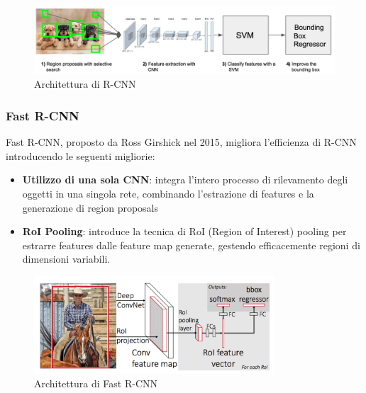 \begin{figure}[ht]
    \centering
    \includegraphics[width=1\textwidth]{files/capitoli/1-object-detection/assets/r-cnn.png}
    \caption{\label{fig:r-cnn}Architettura di R-CNN\cite{7}}
\end{figure}

\vspace{1.7cm}

\subsubsection{Fast R-CNN}
Fast R-CNN, proposto da Ross Girshick nel 2015\cite{8}, migliora l'efficienza di R-CNN introducendo le seguenti migliorie:

\begin{itemize}
    \item \textbf{Utilizzo di una sola CNN}: integra l'intero processo di rilevamento degli oggetti in una singola rete, combinando l'estrazione di features e la generazione di region proposals
    \item \textbf{RoI Pooling}: introduce la tecnica di RoI (Region of Interest) pooling per estrarre features dalle feature map generate, gestendo efficacemente regioni di dimensioni variabili.
\end{itemize}

\begin{figure}[ht]
    \centering
    \includegraphics[width=0.8\textwidth]{files/capitoli/1-object-detection/assets/fast-r-cnn.png}
    \caption{\label{fig:fast-r-cnn}Architettura di Fast R-CNN\cite{9}}
\end{figure}

\vspace{1.6cm}

